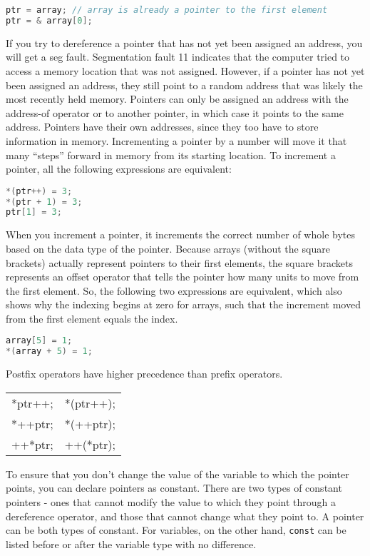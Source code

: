 \documentclass[10pt]{article}
\begin{document}
\begin{lstlisting}[language=C++]
ptr = array; // array is already a pointer to the first element
ptr = & array[0];
\end{lstlisting}

If you try to dereference a pointer that has not yet been assigned an address, you will get a seg fault. Segmentation fault 11 indicates that the computer tried to access a memory location that was not assigned. However, if a pointer has not yet been assigned an address, they still point to a random address that was likely the most recently held memory. Pointers can only be assigned an address with the address-of operator or to another pointer, in which case it points to the same address. Pointers have their own addresses, since they too have to store information in memory. Incrementing a pointer by a number will move it that many ``steps'' forward in memory from its starting location. To increment a pointer, all the following expressions are equivalent:

\begin{lstlisting}[language=C++]
*(ptr++) = 3;
*(ptr + 1) = 3;
ptr[1] = 3;
\end{lstlisting}

When you increment a pointer, it increments the correct number of whole bytes based on the data type of the pointer. Because arrays (without the square brackets) actually represent pointers to their first elements, the square brackets represents an offset operator that tells the pointer how many units to move from the first element. So, the following two expressions are equivalent, which also shows why the indexing begins at zero for arrays, such that the increment moved from the first element equals the index.

\begin{lstlisting}[language=C++]
array[5] = 1;
*(array + 5) = 1;
\end{lstlisting}

Postfix operators have higher precedence than prefix operators.

\begin{center}
\begin{tabular}{l l}
*ptr++; & *(ptr++);\\
*++ptr; & *(++ptr);\\
++*ptr; & ++(*ptr);\\
\end{tabular}
\end{center}

To ensure that you don't change the value of the variable to which the pointer points, you can declare pointers as constant. There are two types of constant pointers - ones that cannot modify the value to which they point through a dereference operator, and those that cannot change what they point to. A pointer can be both types of constant. For variables, on the other hand, \texttt{const} can be listed before or after the variable type with no difference.
\end{document}
